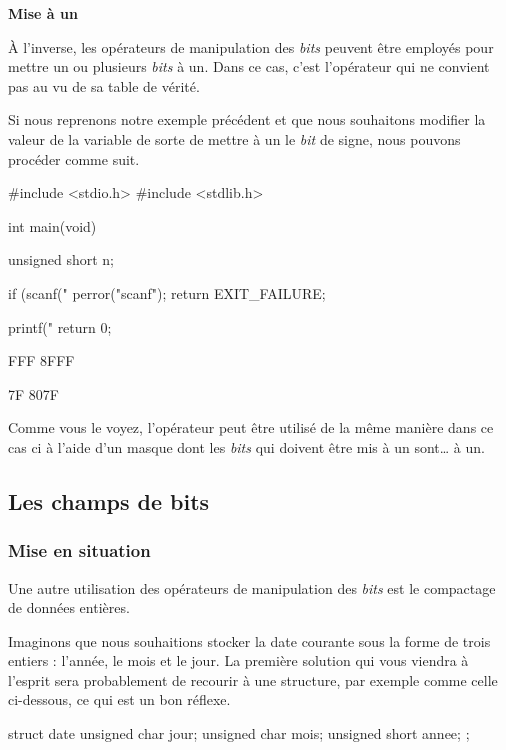\textbf{Mise à un}
\label{mise-a-un}

À l'inverse, les opérateurs de manipulation des \emph{bits} peuvent être
employés pour mettre un ou plusieurs \emph{bits} à un. Dans ce cas,
c'est l'opérateur \mybox{\&} qui ne convient pas au vu de sa table de
vérité.

Si nous reprenons notre exemple précédent et que nous souhaitons
modifier la valeur de la variable  de sorte de mettre à un le
\emph{bit} de signe, nous pouvons procéder comme suit.

\begin{C}
#include <stdio.h>
#include <stdlib.h>


int main(void)
{
    unsigned short n;

    if (scanf("%
    {
        perror("scanf");
        return EXIT_FAILURE;
    }

    printf("%
    return 0;
}
\end{C}

\begin{C}
FFF
8FFF

7F
807F
\end{C}

Comme vous le voyez, l'opérateur \mybox{\textbar{}} peut être utilisé
de la même manière dans ce cas ci à l'aide d'un masque dont les
\emph{bits} qui doivent être mis à un sont\ldots{} à un.

\subsection{Les champs de bits}
\label{les-champs-de-bits}

\subsubsection{Mise en situation}
\label{mise-en-situation-1}

Une autre utilisation des opérateurs de manipulation des \emph{bits} est
le compactage de données entières.

Imaginons que nous souhaitions stocker la date courante sous la forme de
trois entiers : l'année, le mois et le jour. La première solution qui
vous viendra à l'esprit sera probablement de recourir à une structure,
par exemple comme celle ci-dessous, ce qui est un bon réflexe.

\begin{C}
struct date {
    unsigned char jour;
    unsigned char mois;
    unsigned short annee;
};
\end{C}

